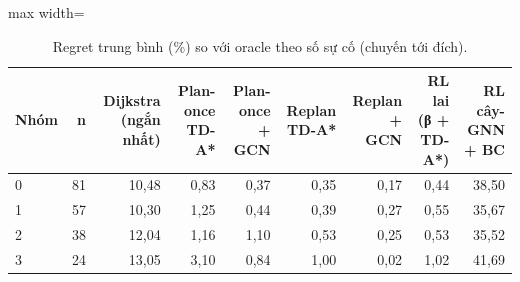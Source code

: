 \begin{table}[!htbp]
\centering
\small
\caption{Regret trung bình (\%) so với oracle theo số sự cố (chuyến tới đích).}
\label{tab:tab_by_incidents}
\begin{adjustbox}{max width=\linewidth}
\begin{tabular}{lrrrrrrrr}
\toprule
Nhóm & n & Dijkstra (ngắn nhất) & Plan-once TD-A* & Plan-once + GCN & Replan TD-A* & Replan + GCN & RL lai (β + TD-A*) & RL cây-GNN + BC \\
\midrule
0 & 81 & 10{,}48 & 0{,}83 & 0{,}37 & 0{,}35 & 0{,}17 & 0{,}44 & 38{,}50 \\
1 & 57 & 10{,}30 & 1{,}25 & 0{,}44 & 0{,}39 & 0{,}27 & 0{,}55 & 35{,}67 \\
2 & 38 & 12{,}04 & 1{,}16 & 1{,}10 & 0{,}53 & 0{,}25 & 0{,}53 & 35{,}52 \\
3 & 24 & 13{,}05 & 3{,}10 & 0{,}84 & 1{,}00 & 0{,}02 & 1{,}02 & 41{,}69 \\
\bottomrule
\end{tabular}
\end{adjustbox}
\end{table}
